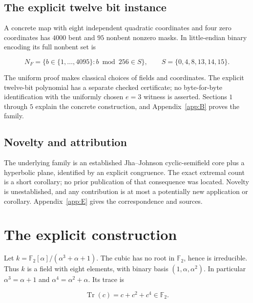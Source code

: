 \documentclass[11pt,a4paper]{article}
\newcommand{\F}{\mathbb F}
\DeclareMathOperator{\Tr}{Tr}
\theoremstyle{definition}
\begin{document}
\subsection*{The explicit twelve bit instance}

A concrete map with eight independent quadratic coordinates and four zero coordinates has $4000$ bent and $95$ nonbent nonzero masks. In little-endian binary encoding its full nonbent set is


\begin{equation}\label{eq:11}
N_F=\{b\in\{1,\ldots,4095\}:b\bmod256\in S\},\qquad S=\{0,4,8,13,14,15\}.
\end{equation}

The uniform proof makes classical choices of fields and coordinates. The explicit twelve-bit polynomial has a separate checked certificate; no byte-for-byte identification with the uniformly chosen $e=3$ witness is asserted. Sections $1$ through $5$ explain the concrete construction, and Appendix~\ref{app:B} proves the family.


\subsection*{Novelty and attribution}

The underlying family is an established Jha--Johnson cyclic-semifield core plus a hyperbolic plane, identified by an explicit congruence. The exact extremal count is a short corollary; no prior publication of that consequence was located. Novelty is unestablished, and any contribution is at most a potentially new application or corollary. Appendix~\ref{app:E} gives the correspondence and sources.


\clearpage

\section{The explicit construction}\label{sec:explicit}

Let $k = \F_{2}[\alpha ]/(\alpha ^{3}+\alpha +1)$. The cubic has no root in $\F_{2}$, hence is irreducible. Thus $k$ is a field with eight elements, with binary basis $(1,\alpha ,\alpha ^{2})$. In particular $\alpha ^{3} = \alpha +1$ and $\alpha ^{4} = \alpha ^{2}+\alpha $. Its trace is


\begin{equation}\label{eq:18}
\Tr(c)=c+c^2+c^4\in\F_2.
\end{equation}
\end{document}
